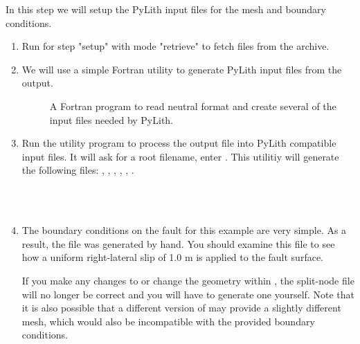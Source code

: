 In this step we will setup the PyLith input files for the mesh and
boundary conditions.

\begin{enumerate}
\item Run  for step "setup" with mode "retrieve" to
  fetch files from the archive.

  \begin{screen}
    \shellprompt{}
  \end{screen}
  
\item We will use a simple Fortran utility to generate PyLith
  input files from the  output.

  \begin{description}
  \item[] A Fortran program to read
     neutral format and create several of the
    input files needed by PyLith.
  \end{description}
  
\item Run the  utility program to process the
   output file into PyLith compatible input files.
  It will ask for a root filename, enter . This
  utilitiy will generate the following files:
  , ,
  , ,
  , .

  \begin{screen}
    \shellprompt{}
    \\
    \\
  \end{screen}
  
\item The boundary conditions on the fault for this example are
  very simple. As a result, the  file was
  generated by hand. You should examine this file to see how a uniform
  right-lateral slip of 1.0 m is applied to the fault surface.

  \begin{warning}
    If you make any changes to  or change the
    geometry within , the split-node file
     will no longer be correct and you will
    have to generate one yourself.  Note that it is also possible that
    a different version of  may provide a slightly
    different mesh, which would also be incompatible with the provided
    boundary conditions.
  \end{warning}
  

\end{enumerate}
